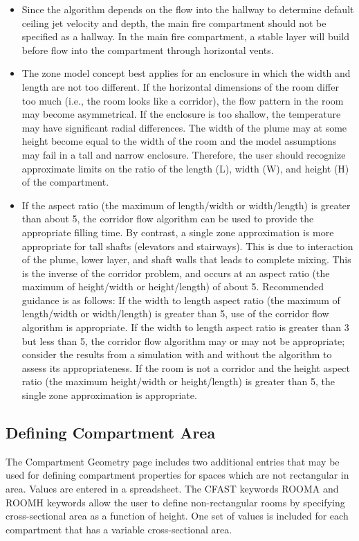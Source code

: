 \begin{itemize}
\item  Since the algorithm depends on the flow into the hallway to determine default ceiling jet velocity and depth, the main fire compartment should not be specified as a hallway. In the main fire compartment, a stable layer will build before flow into the compartment through horizontal vents.
\item The zone model concept best applies for an enclosure in which the width and length are not too different.  If the horizontal dimensions of the room differ too much (i.e., the room looks like a corridor), the flow pattern in the room may become asymmetrical. If the enclosure is too shallow, the temperature may have significant radial differences. The width of the plume may at some height become equal to the width of the room and the model assumptions may fail in a tall and narrow enclosure. Therefore, the user should recognize approximate limits on the ratio of the length (L), width (W), and height (H) of the compartment. 
\item If the aspect ratio (the maximum of length/width or width/length) is greater than about 5, the corridor flow algorithm can be used to provide the appropriate filling time. By contrast, a single zone approximation is more appropriate for tall shafts (elevators and stairways).  This is due to interaction of the plume, lower layer, and shaft walls that leads to complete mixing.  This is the inverse of the corridor problem, and occurs at an aspect ratio (the maximum of height/width or height/length) of about 5. Recommended guidance is as follows:  If the width to length aspect ratio (the maximum of length/width or width/length) is greater than 5, use of the corridor flow algorithm is appropriate. If the width to length aspect ratio is greater than 3 but less than 5, the corridor flow algorithm may or may not be appropriate; consider the results from a simulation with and without the algorithm to assess its appropriateness. If the room is not a corridor and the height aspect ratio (the maximum height/width or height/length) is greater than 5, the single zone approximation is appropriate.
\end{itemize}

\subsection{Defining Compartment Area}

The Compartment Geometry page includes two additional entries that may be used for defining compartment properties for spaces which are not rectangular in area.  Values are entered in a spreadsheet. The CFAST keywords ROOMA and ROOMH keywords allow the user to define non-rectangular rooms by specifying cross-sectional area as a function of height. One set of values is included for each compartment that has a variable cross-sectional area.

